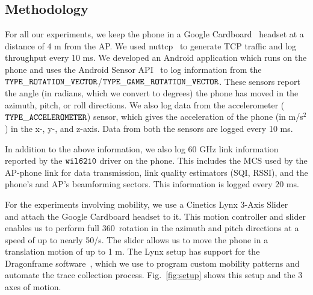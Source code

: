 \documentclass[sigconf,anonymous]{acmart}
\begin{document}






\subsection{Methodology}

For all our experiments, we keep the phone in a Google
Cardboard~\cite{cardboard} headset at a distance of 4 m from the
AP. We used nuttcp~\cite{nuttcp} to generate TCP traffic and log
throughput every 10 ms. We developed an Android application which runs
on the phone and uses the Android Sensor API~\cite{android-sensor} to
log information from the
$\tt{TYPE\_ROTATION\_VECTOR}$/$\tt{TYPE\_GAME\_ROTATION\_VECTOR}$. These
sensors report the angle (in radians, which we convert to degrees) the
phone has moved in the azimuth, pitch, or roll directions. We also log
data from the accelerometer ($\tt{TYPE\_ACCELEROMETER}$) sensor, which
gives the acceleration of the phone (in m/s$^2$) in the x-, y-, and
z-axis. Data from both the sensors are logged every 10 ms.

In addition to the above information, we also log 60 GHz link information reported by the $\tt{wil6210}$ driver on the phone. This includes the MCS used by the AP-phone link for data transmission, link quality estimators (SQI, RSSI), and the phone's and AP's beamforming sectors. This information is logged every 20 ms.

For the experiments involving mobility, we use a Cinetics Lynx 3-Axis Slider~\cite{cinetics-lynx} and attach the Google Cardboard headset to it. This motion controller and slider enables us to perform full 360\degree~rotation in the azimuth and pitch directions at a speed of up to nearly 50\degree/s. The slider allows us to move the phone in a translation motion of up to 1 m. The Lynx setup has support for the Dragonframe software~\cite{dragonframe}, which we use to program custom mobility patterns and automate the trace collection process. Fig.~\ref{fig:setup} shows this setup and the 3 axes of motion.
\end{document}
